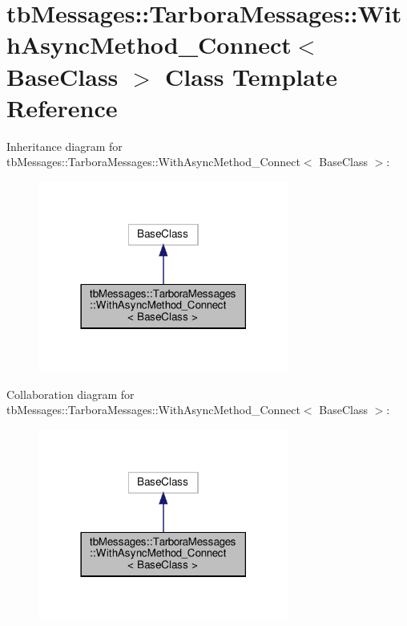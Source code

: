 \hypertarget{classtbMessages_1_1TarboraMessages_1_1WithAsyncMethod__Connect}{}\section{tb\+Messages\+:\+:Tarbora\+Messages\+:\+:With\+Async\+Method\+\_\+\+Connect$<$ Base\+Class $>$ Class Template Reference}
\label{classtbMessages_1_1TarboraMessages_1_1WithAsyncMethod__Connect}


Inheritance diagram for tb\+Messages\+:\+:Tarbora\+Messages\+:\+:With\+Async\+Method\+\_\+\+Connect$<$ Base\+Class $>$\+:
\nopagebreak
\begin{figure}[H]
\begin{center}
\leavevmode
\includegraphics[width=234pt]{classtbMessages_1_1TarboraMessages_1_1WithAsyncMethod__Connect__inherit__graph}
\end{center}
\end{figure}


Collaboration diagram for tb\+Messages\+:\+:Tarbora\+Messages\+:\+:With\+Async\+Method\+\_\+\+Connect$<$ Base\+Class $>$\+:
\nopagebreak
\begin{figure}[H]
\begin{center}
\leavevmode
\includegraphics[width=234pt]{classtbMessages_1_1TarboraMessages_1_1WithAsyncMethod__Connect__coll__graph}
\end{center}
\end{figure}
